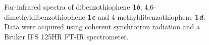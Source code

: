 \begin{figure}[H]
					\caption{Far-infrared spectra of dibenzothiophene \textbf{1\textit{b}}, 4,6-dimethyldibenzothiophene \textbf{1\textit{c}} and 4-methyldibenzothiophene \textbf{1\textit{d}}. Data were acquired using coherent synchrotron radiation and a Bruker IFS 125HR FT-IR spectrometer.}  \label{mole-verylow}
				\end{figure}
	
	